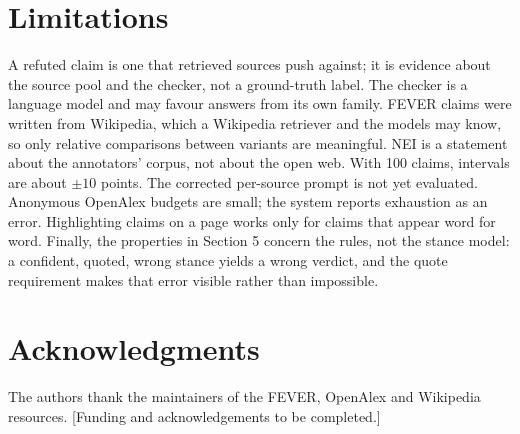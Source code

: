 \documentclass[11pt,a4paper]{article}
\begin{document}
\section*{Limitations}

A refuted claim is one that retrieved sources push against; it is evidence about the source pool and the checker, not a ground-truth label. The checker is a language model and may favour answers from its own family. FEVER claims were written from Wikipedia, which a Wikipedia retriever and the models may know, so only relative comparisons between variants are meaningful. NEI is a statement about the annotators' corpus, not about the open web. With 100 claims, intervals are about $\pm 10$ points. The corrected per-source prompt is not yet evaluated. Anonymous OpenAlex budgets are small; the system reports exhaustion as an error. Highlighting claims on a page works only for claims that appear word for word. Finally, the properties in Section 5 concern the rules, not the stance model: a confident, quoted, wrong stance yields a wrong verdict, and the quote requirement makes that error visible rather than impossible.

\section*{Acknowledgments}
The authors thank the maintainers of the FEVER, OpenAlex and Wikipedia resources. [Funding and acknowledgements to be completed.]
\end{document}
